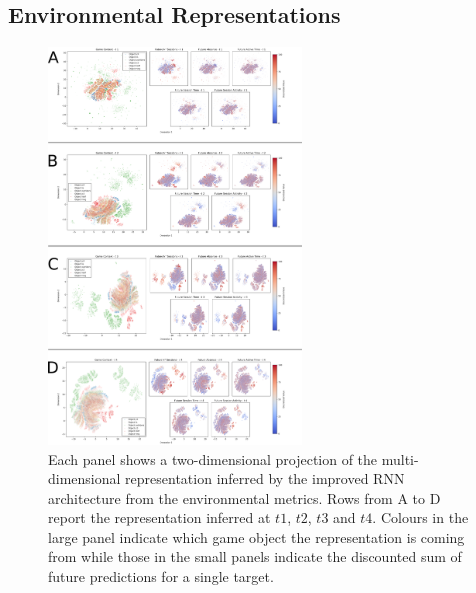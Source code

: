 \subsection{Environmental Representations}
\begin{figure}[!htb]
\includegraphics[width=0.6\textwidth]{images/appendix_D/rnn_full_env_umap.png}
\centering
\caption[\textbf{Lower dimensional representation of the latent representations generated by the improved RNN architecture from the environmental metrics}]{Each panel shows a two-dimensional projection of the multi-dimensional representation inferred by the improved RNN architecture from the environmental metrics. Rows from A to D report the representation inferred at $t1$, $t2$, $t3$ and $t4$. Colours in the large panel indicate which game object the representation is coming from while those in the small panels indicate the discounted sum of future predictions for a single target.}
\end{figure}
\FloatBarrier

